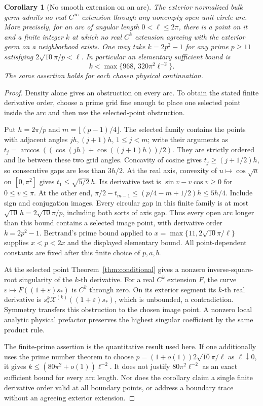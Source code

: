 \documentclass[11pt]{article}
\numberwithin{equation}{section}
\newtheorem{corollary}[theorem]{Corollary}
\theoremstyle{definition}
\newcommand{\eps}{\varepsilon}
\begin{document}
\begin{corollary}[No smooth extension on an arc]\label{cor:smootharc}
The exterior normalized bulk germ admits no real \(C^\infty\)
extension through any nonempty open unit-circle arc. More precisely,
for an arc of angular length \(0<\ell\le2\pi\), there is a point
on it and a finite integer \(k\) at which no real \(C^k\)
extension agreeing with the exterior germ on a neighborhood exists.
One may take \(k=2p^2-1\) for any prime \(p\ge11\) satisfying
\(2\sqrt{10}\pi/p<\ell\). In particular an elementary sufficient
bound is
\[
 k<\max\{968,\,320\pi^2\ell^{-2}\}.
\]
The same assertion holds for each chosen physical continuation.
\end{corollary}
\begin{proof}
Density alone gives an obstruction on every arc. To obtain the stated finite derivative order, choose a prime grid fine enough to place one selected point inside the arc and then use the selected-point obstruction.

Put \(h=2\pi/p\) and \(m=\lfloor(p-1)/4\rfloor\).
The selected family contains the points with adjacent angles
\(jh,(j+1)h\), \(1\le j<m\); write their arguments as
\(t_j=\arccos((\cos(jh)+\cos((j+1)h))/2)\).
They are strictly ordered and lie between these two grid angles.
Concavity of cosine gives \(t_j\ge(j+1/2)h\), so consecutive
gaps are less than \(3h/2\). At the real axis,
convexity of \(u\mapsto\cos\sqrt u\) on \([0,\pi^2]\) gives
\(t_1\le\sqrt{5/2}\,h\). Its derivative test is
\(\sin v-v\cos v\ge0\) for \(0\le v\le\pi\).
At the other end,
\(\pi/2-t_{m-1}\le(p/4-m+1/2)h\le5h/4\).
Include sign and conjugation images. Every circular gap in this
finite family is at most \(\sqrt{10}\,h=2\sqrt{10}\pi/p\),
including both sorts of axis gap. Thus every open arc longer than
this bound contains a selected image point, with derivative order
\(k=2p^2-1\). Bertrand's prime bound applied to
\(x=\max\{11,2\sqrt{10}\pi/\ell\}\) supplies \(x<p<2x\)
and the displayed elementary bound. All point-dependent constants
are fixed after this finite choice of \(p,a,b\).

At the selected point Theorem~\ref{thm:conditional} gives a nonzero
inverse-square-root singularity of the \(k\)-th derivative.
For a real \(C^k\) extension \(F\), the curve
\(\eps\mapsto F((1+\eps)s_*)\) is \(C^k\) through zero.
On its exterior segment its \(k\)-th real derivative is
\(s_*^k\mathcal X^{(k)}((1+\eps)s_*)\), which is unbounded,
a contradiction. Symmetry transfers this obstruction to the chosen
image point. A nonzero local analytic physical prefactor preserves
the highest singular coefficient by the same product rule.

The finite-prime assertion is the quantitative result used here.
If one additionally uses the prime number theorem to choose
\(p=(1+o(1))2\sqrt{10}\pi/\ell\) as \(\ell\downarrow0\),
it gives \(k\le(80\pi^2+o(1))\ell^{-2}\).
It does not justify \(80\pi^2\ell^{-2}\) as an exact sufficient
bound for every arc length. Nor does the corollary claim a single
finite derivative order valid at all boundary points, or address a
boundary trace without an agreeing exterior extension.
\end{proof}
\end{document}
